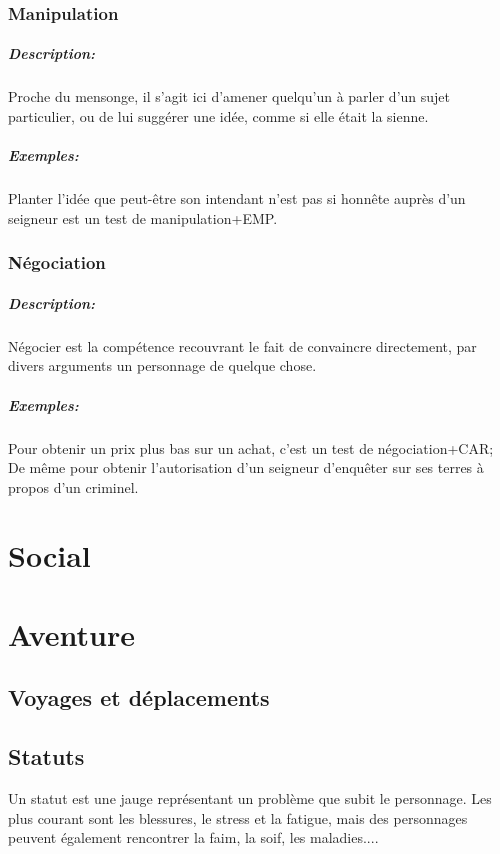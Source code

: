 \documentclass[10pt,a4paper,twocolumn]{book}
\begin{document}
\subsection{Manipulation}
\paragraph{Description:}Proche du mensonge, il s'agit ici d'amener quelqu'un à parler d'un sujet particulier, ou de lui suggérer une idée, comme si elle était la sienne.
\paragraph{Exemples:}Planter l'idée que peut-être son intendant n'est pas si honnête auprès d'un seigneur est un test de manipulation+EMP.
\subsection{Négociation}
\paragraph{Description:}Négocier est la compétence recouvrant le fait de convaincre directement, par divers arguments un personnage de quelque chose.
\paragraph{Exemples:}Pour obtenir un prix plus bas sur un achat, c'est un test de négociation+CAR; De même pour obtenir l'autorisation d'un seigneur d'enquêter sur ses terres à propos d'un criminel.

\chapter{Social}
\chapter{Aventure}
\section{Voyages et déplacements}
\section{Statuts}
Un statut est une jauge représentant un problème que subit le personnage. Les plus courant sont les blessures, le stress et la fatigue, mais des personnages peuvent également rencontrer la faim, la soif, les maladies....
\end{document}
